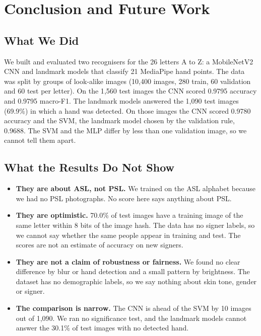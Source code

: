\section{Conclusion and Future Work}
\label{sec:conclusion}

\subsection{What We Did}

We built and evaluated two recognisers for the 26 letters A to Z: a MobileNetV2 CNN and landmark models that classify 21 MediaPipe hand points. The data was split by groups of look-alike images (10{,}400 images, 280 train, 60 validation and 60 test per letter). On the 1{,}560 test images the CNN scored 0.9795 accuracy and 0.9795 macro-F1. The landmark models answered the 1{,}090 test images (69.9\%) in which a hand was detected. On those images the CNN scored 0.9780 accuracy and the SVM, the landmark model chosen by the validation rule, 0.9688. The SVM and the MLP differ by less than one validation image, so we cannot tell them apart.

\subsection{What the Results Do Not Show}

\begin{itemize}
  \item \textbf{They are about ASL, not PSL.} We trained on the ASL alphabet because we had no PSL photographs. No score here says anything about PSL.
  \item \textbf{They are optimistic.} 70.0\% of test images have a training image of the same letter within 8 bits of the image hash. The data has no signer labels, so we cannot say whether the same people appear in training and test. The scores are not an estimate of accuracy on new signers.
  \item \textbf{They are not a claim of robustness or fairness.} We found no clear difference by blur or hand detection and a small pattern by brightness. The dataset has no demographic labels, so we say nothing about skin tone, gender or signer.
  \item \textbf{The comparison is narrow.} The CNN is ahead of the SVM by 10 images out of 1{,}090. We ran no significance test, and the landmark models cannot answer the 30.1\% of test images with no detected hand.
\end{itemize}

